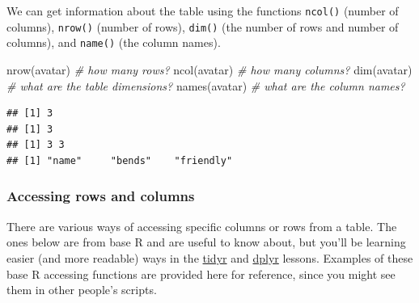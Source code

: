 \documentclass[
  oneside]{book}
\newenvironment{Shaded}{\begin{snugshade}}{\end{snugshade}}
\newcommand{\CommentTok}[1]{\textcolor[rgb]{0.56,0.35,0.01}{\textit{#1}}}
\newcommand{\DecValTok}[1]{\textcolor[rgb]{0.00,0.00,0.81}{#1}}
\newcommand{\FunctionTok}[1]{\textcolor[rgb]{0.00,0.00,0.00}{#1}}
\newcommand{\NormalTok}[1]{#1}
\newcommand{\OtherTok}[1]{\textcolor[rgb]{0.56,0.35,0.01}{#1}}
\newcommand{\SpecialCharTok}[1]{\textcolor[rgb]{0.00,0.00,0.00}{#1}}
\newcommand{\StringTok}[1]{\textcolor[rgb]{0.31,0.60,0.02}{#1}}
\begin{document}
We can get information about the table using the functions \texttt{ncol()} (number of columns), \texttt{nrow()} (number of rows), \texttt{dim()} (the number of rows and number of columns), and \texttt{name()} (the column names).

\begin{Shaded}
\begin{Highlighting}[]
\FunctionTok{nrow}\NormalTok{(avatar) }\CommentTok{\# how many rows?}
\FunctionTok{ncol}\NormalTok{(avatar) }\CommentTok{\# how many columns?}
\FunctionTok{dim}\NormalTok{(avatar)  }\CommentTok{\# what are the table dimensions?}
\FunctionTok{names}\NormalTok{(avatar) }\CommentTok{\# what are the column names?}
\end{Highlighting}
\end{Shaded}

\begin{verbatim}
## [1] 3
## [1] 3
## [1] 3 3
## [1] "name"     "bends"    "friendly"
\end{verbatim}

\hypertarget{row-col-access}{%
\subsubsection{Accessing rows and columns}\label{row-col-access}}

There are various ways of accessing specific columns or rows from a table. The ones below are from base R and are useful to know about, but you'll be learning easier (and more readable) ways in the \protect\hyperlink{tidyr}{tidyr} and \protect\hyperlink{dplyr}{dplyr} lessons. Examples of these base R accessing functions are provided here for reference, since you might see them in other people's scripts.

\begin{Shaded}
\end{Shaded}
\end{document}
